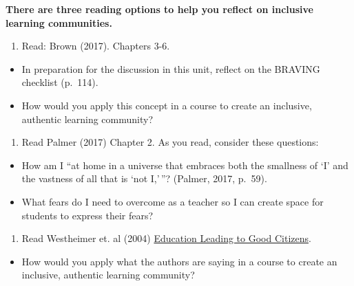 \documentclass[
]{book}
\providecommand{\tightlist}{%
  \setlength{\itemsep}{0pt}\setlength{\parskip}{0pt}}
\begin{document}
\begin{reflect}
\textbf{There are three reading options to help you reflect on inclusive learning communities.}

\begin{enumerate}
\def\labelenumi{\arabic{enumi}.}
\tightlist
\item
  Read: Brown (2017). Chapters 3-6.\\
\end{enumerate}

\begin{itemize}
\tightlist
\item
  In preparation for the discussion in this unit, reflect on the BRAVING checklist (p.~114).\\
\item
  How would you apply this concept in a course to create an inclusive, authentic learning community?\\
\end{itemize}

\begin{enumerate}
\def\labelenumi{\arabic{enumi}.}
\setcounter{enumi}{1}
\tightlist
\item
  Read Palmer (2017) Chapter 2. As you read, consider these questions:\\
\end{enumerate}

\begin{itemize}
\tightlist
\item
  How am I ``at home in a universe that embraces both the smallness of `I' and the vastness of all that is `not I,'\,''? (Palmer, 2017, p.~59).\\
\item
  What fears do I need to overcome as a teacher so I can create space for students to express their fears?\\
\end{itemize}

\begin{enumerate}
\def\labelenumi{\arabic{enumi}.}
\setcounter{enumi}{2}
\tightlist
\item
  Read Westheimer et. al (2004) \href{assets/unit3/Westheimer.pdf}{Education Leading to Good Citizens}.\\
\end{enumerate}

\begin{itemize}
\tightlist
\item
  How would you apply what the authors are saying in a course to create an inclusive, authentic learning community?
\end{itemize}
\end{reflect}
\end{document}
